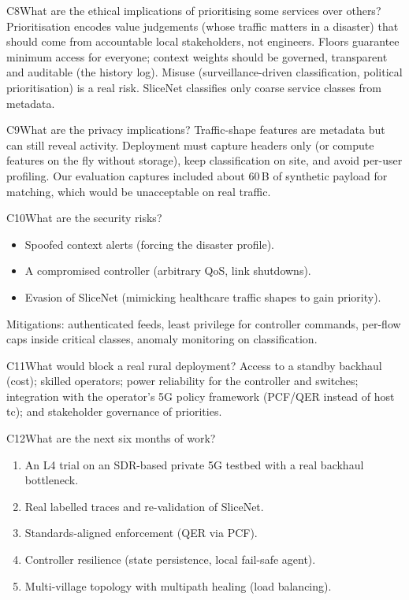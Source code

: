 \begin{qa}{C8}{What are the ethical implications of prioritising some services over others?}
Prioritisation encodes value judgements (whose traffic matters in a disaster) that should come from accountable local
stakeholders, not engineers. Floors guarantee minimum access for everyone; context weights should be governed,
transparent and auditable (the history log). Misuse (surveillance-driven classification, political prioritisation) is a
real risk. SliceNet classifies only coarse service classes from metadata.
\end{qa}

\begin{qa}{C9}{What are the privacy implications?}
Traffic-shape features are metadata but can still reveal activity. Deployment must capture headers only (or compute
features on the fly without storage), keep classification on site, and avoid per-user profiling. Our evaluation
captures included about 60\,B of synthetic payload for matching, which would be unacceptable on real traffic.
\end{qa}

\begin{qa}{C10}{What are the security risks?}
\begin{itemize}
\item Spoofed context alerts (forcing the disaster profile).
\item A compromised controller (arbitrary QoS, link shutdowns).
\item Evasion of SliceNet (mimicking healthcare traffic shapes to gain priority).
\end{itemize}
Mitigations: authenticated feeds, least privilege for controller commands, per-flow caps inside critical classes,
anomaly monitoring on classification.
\end{qa}

\begin{qa}{C11}{What would block a real rural deployment?}
Access to a standby backhaul (cost); skilled operators; power reliability for the controller and switches; integration
with the operator's 5G policy framework (PCF/QER instead of host tc); and stakeholder governance of priorities.
\end{qa}

\begin{qa}{C12}{What are the next six months of work?}
\begin{enumerate}
\item An L4 trial on an SDR-based private 5G testbed with a real backhaul bottleneck.
\item Real labelled traces and re-validation of SliceNet.
\item Standards-aligned enforcement (QER via PCF).
\item Controller resilience (state persistence, local fail-safe agent).
\item Multi-village topology with multipath healing (load balancing).
\end{enumerate}
\end{qa}


